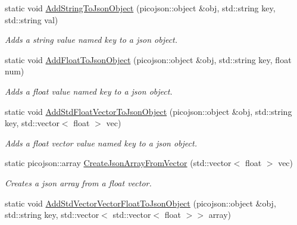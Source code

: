 \begin{DoxyCompactItemize}
\mbox{\label{classcsci3081_1_1JsonHelper_a036b0eb621942715e3a72c89932ebaee}} 
static void \hyperlink{classcsci3081_1_1JsonHelper_a036b0eb621942715e3a72c89932ebaee}{Add\+String\+To\+Json\+Object} (picojson\+::object \&obj, std\+::string key, std\+::string val)
\begin{DoxyCompactList}\small\item\em Adds a string value named key to a json object. \end{DoxyCompactList}\item 
\mbox{\label{classcsci3081_1_1JsonHelper_a1573d805bea9871a518466370cc02fa9}} 
static void \hyperlink{classcsci3081_1_1JsonHelper_a1573d805bea9871a518466370cc02fa9}{Add\+Float\+To\+Json\+Object} (picojson\+::object \&obj, std\+::string key, float num)
\begin{DoxyCompactList}\small\item\em Adds a float value named key to a json object. \end{DoxyCompactList}\item 
\mbox{\label{classcsci3081_1_1JsonHelper_acbcf77e9f8d54e7d6ce39caaa6564a0e}} 
static void \hyperlink{classcsci3081_1_1JsonHelper_acbcf77e9f8d54e7d6ce39caaa6564a0e}{Add\+Std\+Float\+Vector\+To\+Json\+Object} (picojson\+::object \&obj, std\+::string key, std\+::vector$<$ float $>$ vec)
\begin{DoxyCompactList}\small\item\em Adds a float vector value named key to a json object. \end{DoxyCompactList}\item 
\mbox{\label{classcsci3081_1_1JsonHelper_ae87680699677b9f6d34b93c96f16ee61}} 
static picojson\+::array \hyperlink{classcsci3081_1_1JsonHelper_ae87680699677b9f6d34b93c96f16ee61}{Create\+Json\+Array\+From\+Vector} (std\+::vector$<$ float $>$ vec)
\begin{DoxyCompactList}\small\item\em Creates a json array from a float vector. \end{DoxyCompactList}\item 
\mbox{\label{classcsci3081_1_1JsonHelper_a5e57c802c5147d4fb94834230b5720e2}} 
static void \hyperlink{classcsci3081_1_1JsonHelper_a5e57c802c5147d4fb94834230b5720e2}{Add\+Std\+Vector\+Vector\+Float\+To\+Json\+Object} (picojson\+::object \&obj, std\+::string key, std\+::vector$<$ std\+::vector$<$ float $>$$>$ array)
$$
\end{DoxyCompactItemize}
